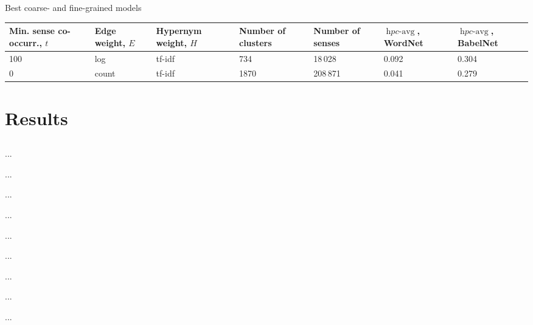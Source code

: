 \documentclass[usenames,dvipsnames]{beamer}
\DeclareMathOperator{\hpcavg}{\mathit{hpc}-avg}
\begin{document}
\begin{frame}{Best coarse- and fine-grained models}


\begin{table}
\scriptsize
\centering
\begin{tabular}{p{1.4cm}|p{1.2cm}|p{1.2cm}|p{1.3cm}|p{1.1cm}|p{1.2cm}|p{1.2cm}}
  \textbf{Min. sense co-occurr.}, $t$ & \textbf{Edge weight}, $E$ & \textbf{Hypernym weight}, $H$ & \textbf{Number of clusters} & \textbf{Number of senses} & $\hpcavg$, \textbf{WordNet} & $\hpcavg$, \textbf{BabelNet} \\ \toprule

100 & log  & tf-idf & 734  &  18\,028 & 0.092 & 0.304 \\

0  & count  & tf-idf & 1870 & 208\,871 & 0.041 & 0.279 \\
 
\end{tabular}

\end{table}

	
\end{frame}


\section{Results}
\subsection{}

\begin{frame}{ ... }

\end{frame}


\begin{frame}{ ... }

\end{frame}


\begin{frame}{ ... }

\end{frame}


\begin{frame}{ ... }

\end{frame}


\begin{frame}{ ... }

\end{frame}



\begin{frame}{ ... }

\end{frame}


\begin{frame}{ ... }

\end{frame}


\begin{frame}{ ... }

\end{frame}


\begin{frame}{ ... }

\end{frame}




\end{document}

